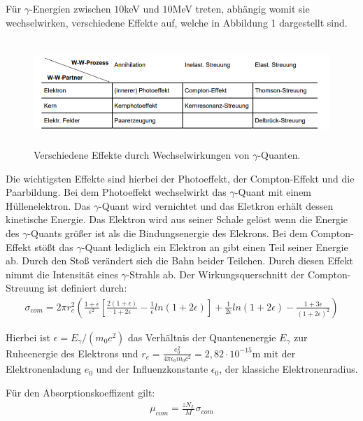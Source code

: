 Für $\gamma$-Energien zwischen $10$keV und $10$MeV treten, abhängig womit sie wechselwirken, verschiedene Effekte auf,
welche in Abbildung 1 dargestellt sind.

\begin{figure}[H]
  \centering
  \includegraphics[height=4cm]{wechselwirkung.PNG}
  \caption{Verschiedene Effekte durch Wechselwirkungen von $\gamma$-Quanten. \cite{sample}}
  \label{fig:Linienspektrum}
\end{figure}

Die wichtigsten Effekte sind hierbei der Photoeffekt, der Compton-Effekt und die Paarbildung. Bei dem Photoeffekt wechselwirkt das
$\gamma$-Quant mit einem Hüllenelektron. Das $\gamma$-Quant wird vernichtet und das Eletkron erhält dessen kinetische Energie.
Das Elektron wird aus seiner Schale gelöst wenn die Energie des $\gamma$-Quants größer ist als die Bindungsenergie des Elekrons.
Bei dem Compton-Effekt stößt das $\gamma$-Quant lediglich ein Elektron an gibt einen Teil seiner Energie ab. Durch den Stoß
verändert sich die Bahn beider Teilchen. Durch diesen Effekt nimmt die Intensität eines $\gamma$-Strahls ab. Der
Wirkungsquerschnitt der Compton-Streuung ist definiert durch:
\begin{align}
  \sigma_{com} = 2 \pi r_e^2 \left(\frac{1+\epsilon}{\epsilon^2} \left[\frac{2(1+\epsilon)}{1+2\epsilon}-\frac{1}{\epsilon} ln(1+2\epsilon) \right]
                + \frac{1}{2\epsilon} ln(1+2\epsilon) - \frac{1+3\epsilon}{(1+2\epsilon)^2} \right)
\end{align}

Hierbei ist $\epsilon = E_{\gamma}/(m_0 c^2)$ das Verhältnis der Quantenenergie $E_{\gamma}$ zur Ruheenergie des Elektrons und
$r_e = \frac{e_0^2}{4 \pi \epsilon_0 m_0 c^2} = 2,82 \cdot 10^{-15}$m mit der Elektronenladung $e_0$ und der
Influenzkonstante $\epsilon_0$, der klassiche Elektronenradius.

Für den Absorptionskoeffizent gilt:
\begin{align}
  \mu_{com} =\frac{z N_L}{M} \sigma_{com}
\end{align}

